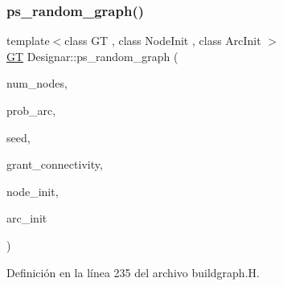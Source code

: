 \subsubsection{\texorpdfstring{ps\+\_\+random\+\_\+graph()}{ps\_random\_graph()}\hspace{0.1cm}{\footnotesize\ttfamily [1/2]}}
{\footnotesize\ttfamily template$<$class GT , class Node\+Init , class Arc\+Init $>$ \\
\hyperlink{demo-buildgraph_8_c_a3001c40d2c31ca87ed96cd7d1334a55e}{GT} Designar\+::ps\+\_\+random\+\_\+graph (\begin{DoxyParamCaption}\item[{\hyperlink{namespace_designar_aa72662848b9f4815e7bf31a7cf3e33d1}{nat\+\_\+t}}]{num\+\_\+nodes,  }\item[{\hyperlink{namespace_designar_aca2c32af26808dbec1f3a3071fad25ce}{real\+\_\+t}}]{prob\+\_\+arc,  }\item[{\hyperlink{namespace_designar_ad621b5646d45288c5d6a1e1dfe7531a8}{rng\+\_\+seed\+\_\+t}}]{seed,  }\item[{bool}]{grant\+\_\+connectivity,  }\item[{Node\+Init \&}]{node\+\_\+init,  }\item[{Arc\+Init \&}]{arc\+\_\+init }\end{DoxyParamCaption})}



Definición en la línea 235 del archivo buildgraph.\+H.

\mbox{\label{namespace_designar_a184e6b7e77faae803df7f45c68c5359a}} 
